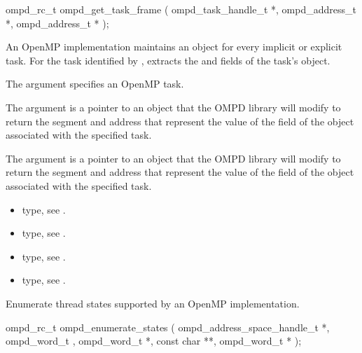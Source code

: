 \format
\begin{cspecific}
\begin{ompSyntax}
ompd_rc_t ompd_get_task_frame (
  ompd_task_handle_t *,
  ompd_address_t *,
  ompd_address_t *
);
\end{ompSyntax}
\end{cspecific}

\descr
An OpenMP implementation  maintains an  object for every implicit or explicit task.
For the task identified by ,  extracts
the  and  fields of the task's  object.

\argdesc

The argument  specifies an OpenMP task.

The argument  is a pointer to an  object that the OMPD library will
modify to return the segment and address that represent the value of the 
field of the  object associated with the specified task.

The argument  is a pointer to an  object that the OMPD library will
modify to return the segment and address that represent the value of the 
field of the  object associated with the specified task.

\crossreferences
\begin{itemize}
  \item {} type, see .
	\item {} type, see .
	\item {} type, see .
	\item {} type, see .
\end{itemize}


\label{subsubsubsec:ompd_enumerate_states}

\summary
Enumerate thread states supported by an OpenMP implementation.

\format
\begin{cspecific}
\begin{ompSyntax}
ompd_rc_t ompd_enumerate_states (
  ompd_address_space_handle_t *,
  ompd_word_t ,
  ompd_word_t *,
  const char **,
  ompd_word_t *
);
\end{ompSyntax}
\end{cspecific}

